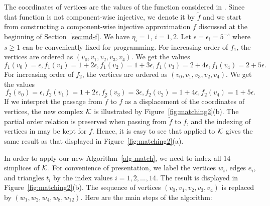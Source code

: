 \documentclass[12pt]{article}
\newcommand{\cK}{{\cal K}}
\begin{document}
The coordinates of vertices are the values of the function considered in \cite{AlKaLa17}. Since that function is not component-wise injective, we denote it by $\tilde{f}$ and we start from constructing a component-wise injective approximation $f$ discussed at the beginning of Section~\ref{sec:md-f}. We have $\eta_i=1$, $i=1,2$. Let $\epsilon=\epsilon_i=5^{-s}$ where $s\geq 1$ can be conveniently fixed for programming. For increasing order of $f_1$, the vertices are ordered as $(v_0,v_1,v_2,v_3,v_4)$. We get the values
\[
f_1(v_0)=\epsilon, f_1(v_1)=1+2\epsilon, f_1(v_2)=1+3\epsilon, f_1(v_3)=2+4\epsilon, f_1(v_4)=2+5\epsilon.
\]
For increasing order of $f_2$, the vertices are ordered as $(v_0,v_1,v_3,v_2,v_4)$. We get the values
\[
f_2(v_0)=\epsilon, f_2(v_1)=1+2\epsilon, f_2(v_3)=3\epsilon, f_2(v_2)=1+4\epsilon, f_2(v_4)=1+5\epsilon.
\]
If we interpret the passage from $\tilde{f}$ to $f$ as a displacement of the coordinates of vertices, the new complex $\cK$ is illustrated by Figure~\ref{fig:matching2}(b). The partial order relation is preserved when passing from $\tilde{f}$ to $f$, and the indexing of vertices in \cite[Figure 2]{AlKaLa17} may be kept for $f$. Hence, it is easy to see that \cite[Algorithm 6]{AlKaLa17} applied to $\cK$ gives the same result as that displayed in Figure~\ref{fig:matching2}(a).

In order to apply our new Algorithm~\ref{alg-match}, we need to index all $14$ simplices of $\cK$. For convenience of presentation, we label the vertices $w_i$, edges $e_i$, and triangles $t_i$ by the index values $i=1,2,...,14$. The result is displayed in Figure~\ref{fig:matching2}(b). The sequence of vertices $(v_0,v_1,v_2,v_3,v_4)$ is replaced by $(w_1,w_2,w_4,w_8,w_{12})$.  Here are the main steps of the algorithm:
\end{document}
